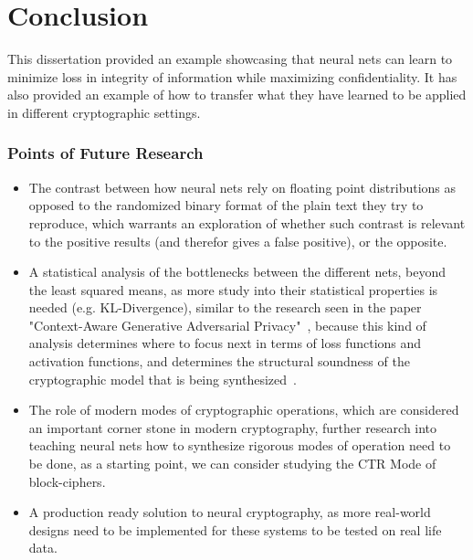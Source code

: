 \documentclass[a4paper, 12pt]{report}
\begin{document}
\chapter{Conclusion}\label{sec:conclusion}
\begin{center}
	\begin{minipage}{0.8\textwidth}
		\justify
		This dissertation provided an example showcasing that neural nets can learn to minimize loss in integrity of information while maximizing confidentiality. It has also provided an example of how to transfer what they have learned to be applied in different cryptographic settings.
	\end{minipage}
\end{center}
\subsection*{\textbf{Points of Future Research}}
\begin{itemize}[nosep]
	\item The contrast between how neural nets rely on floating point distributions as opposed to the randomized binary format of the plain text they try to reproduce, which warrants an exploration of whether such contrast is relevant to the positive results (and therefor gives a false positive), or the opposite.
	\item A statistical analysis of the bottlenecks between the different nets, beyond the least squared means, as more study into their statistical properties is needed (e.g. KL-Divergence), similar to the research seen in the paper "Context-Aware Generative Adversarial Privacy"~\citep{e19120656}, because this kind of analysis determines where to focus next in terms of loss functions and activation functions, and determines the structural soundness of the cryptographic model that is being synthesized~\citep{7031850}.
	\item The role of modern modes of cryptographic operations, which are considered an important corner stone in modern cryptography, further research into teaching neural nets how to synthesize rigorous modes of operation need to be done, as a starting point, we can consider studying the CTR Mode of block-ciphers.~\citep{BlockCipherModes}
	\item A production ready solution to neural cryptography, as more real-world designs need to be implemented for these systems to be tested on real life data.
\end{itemize}
\end{document}
